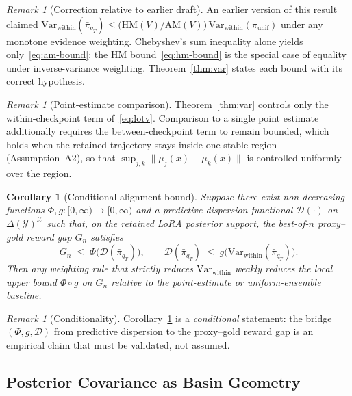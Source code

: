 \documentclass[10pt]{article}
\theoremstyle{plain}
\newtheorem{corollary}[theorem]{Corollary}
\theoremstyle{definition}
\theoremstyle{remark}
\newtheorem{remark}[theorem]{Remark}
\newcommand{\Var}{\mathrm{Var}}
\newcommand{\HM}{\mathrm{HM}}
\newcommand{\AM}{\mathrm{AM}}
\begin{document}
\begin{remark}[Correction relative to earlier draft]\label{rem:var-correction}
An earlier version of this result claimed
$\Var_{\mathrm{within}}(\bar{\pi}_{q_T}) \le \bigl(\HM(V)/\AM(V)\bigr)\,\Var_{\mathrm{within}}(\pi_{\mathrm{unif}})$ under any monotone evidence weighting. Chebyshev's sum inequality alone yields only~\eqref{eq:am-bound}; the $\HM$ bound~\eqref{eq:hm-bound} is the special case of equality under inverse-variance weighting. Theorem~\ref{thm:var} states each bound with its correct hypothesis.
\end{remark}

\begin{remark}[Point-estimate comparison]
Theorem~\ref{thm:var} controls only the within-checkpoint term of~\eqref{eq:lotv}. Comparison to a single point estimate additionally requires the between-checkpoint term to remain bounded, which holds when the retained trajectory stays inside one stable region (Assumption~A2), so that $\sup_{j,k}\|\mu_j(x)-\mu_k(x)\|$ is controlled uniformly over the region.
\end{remark}

\begin{corollary}[Conditional alignment bound]\label{cor:align-var}
Suppose there exist non-decreasing functions $\Phi,g:[0,\infty)\to[0,\infty)$ and a predictive-dispersion functional $\mathcal{D}(\cdot)$ on $\Delta(\mathcal{Y})^\mathcal{X}$ such that, on the retained LoRA posterior support, the best-of-$n$ proxy--gold reward gap $G_n$ satisfies
\[
G_n \;\le\; \Phi\!\bigl(\mathcal{D}(\bar{\pi}_{q_T})\bigr), \qquad
\mathcal{D}(\bar{\pi}_{q_T}) \;\le\; g\!\bigl(\Var_{\mathrm{within}}(\bar{\pi}_{q_T})\bigr).
\]
Then any weighting rule that strictly reduces $\Var_{\mathrm{within}}$ weakly reduces the local upper bound $\Phi\!\circ\! g$ on $G_n$ relative to the point-estimate or uniform-ensemble baseline.
\end{corollary}

\begin{remark}[Conditionality]
Corollary~\ref{cor:align-var} is a \emph{conditional} statement: the bridge $(\Phi,g,\mathcal{D})$ from predictive dispersion to the proxy--gold reward gap is an empirical claim that must be validated, not assumed.
\end{remark}

\subsection{Posterior Covariance as Basin Geometry}\label{sec:geom}
\end{document}
